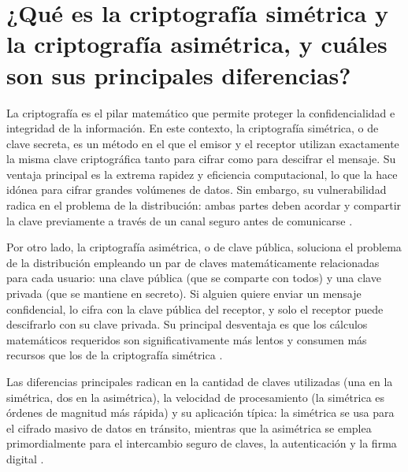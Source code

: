 \documentclass[a4paper,12pt]{article}
\begin{document}
\renewcommand{\footrulewidth}{0.4pt}  %

\setcounter{page}{1}

\tableofcontents


\newpage

\section{¿Qué es la criptografía simétrica y la criptografía asimétrica, y cuáles son sus principales diferencias?}

La criptografía es el pilar matemático que permite proteger la confidencialidad e integridad de la información. En este contexto, la criptografía simétrica, o de clave secreta, es un método en el que el emisor y el receptor utilizan exactamente la misma clave criptográfica tanto para cifrar como para descifrar el mensaje. Su ventaja principal es la extrema rapidez y eficiencia computacional, lo que la hace idónea para cifrar grandes volúmenes de datos. Sin embargo, su vulnerabilidad radica en el problema de la distribución: ambas partes deben acordar y compartir la clave previamente a través de un canal seguro antes de comunicarse \cite{stallings2017}.

Por otro lado, la criptografía asimétrica, o de clave pública, soluciona el problema de la distribución empleando un par de claves matemáticamente relacionadas para cada usuario: una clave pública (que se comparte con todos) y una clave privada (que se mantiene en secreto). Si alguien quiere enviar un mensaje confidencial, lo cifra con la clave pública del receptor, y solo el receptor puede descifrarlo con su clave privada. Su principal desventaja es que los cálculos matemáticos requeridos son significativamente más lentos y consumen más recursos que los de la criptografía simétrica \cite{kurose2017}.

Las diferencias principales radican en la cantidad de claves utilizadas (una en la simétrica, dos en la asimétrica), la velocidad de procesamiento (la simétrica es órdenes de magnitud más rápida) y su aplicación típica: la simétrica se usa para el cifrado masivo de datos en tránsito, mientras que la asimétrica se emplea primordialmente para el intercambio seguro de claves, la autenticación y la firma digital \cite{forouzan2015}.
\end{document}
